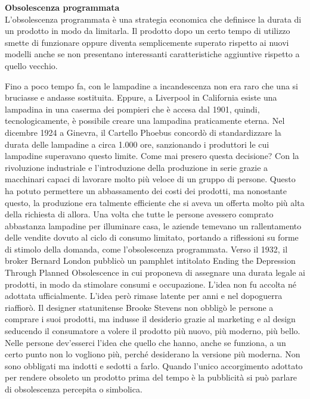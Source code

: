 \documentclass[12pt]{book} %
\begin{document}
\noindent \textbf{\large Obsolescenza programmata} \\
L'obsolescenza programmata è una strategia economica che definisce la durata di un prodotto in modo
da limitarla. Il prodotto dopo un certo tempo di utilizzo smette di funzionare oppure diventa semplicemente superato
rispetto ai nuovi modelli anche se non presentano interessanti caratteristiche aggiuntive rispetto a quello vecchio.

Fino a poco tempo fa, con le lampadine a incandescenza non era raro che
una si bruciasse e andasse sostituita. Eppure, a Liverpool in California esiste una lampadina in una caserma dei
pompieri che è accesa dal 1901, quindi, tecnologicamente, è possibile creare una lampadina praticamente eterna. Nel dicembre 1924 a Ginevra, il Cartello Phoebus concordò di standardizzare la durata delle lampadine a circa 1.000 ore, sanzionando i produttori le cui lampadine superavano questo limite. Come mai presero questa decisione? Con la rivoluzione industriale e
l'introduzione della produzione in serie grazie a macchinari capaci di lavorare molto più veloce
di un gruppo di persone. Questo ha potuto permettere un abbassamento dei costi dei prodotti, ma nonostante questo, la
produzione era talmente efficiente che si aveva un offerta molto più alta della richiesta di allora. 
Una volta che tutte le persone avessero comprato abbastanza lampadine per illuminare casa, le aziende temevano un rallentamento delle vendite dovuto al ciclo di consumo limitato, portando a riflessioni su forme di stimolo della domanda, come l’obsolescenza programmata. 
Verso il 1932, il broker Bernard London pubblicò un pamphlet intitolato Ending the Depression Through Planned Obsolescence in cui proponeva di assegnare una durata legale ai prodotti, in modo da stimolare consumi e occupazione. L’idea non fu accolta né adottata ufficialmente. L'idea però rimase latente per anni e nel dopoguerra riaffiorò. Il designer statunitense Brooke
Stevens non obbligò le persone a comprare i suoi prodotti, ma indusse il desiderio grazie al marketing e al design
seducendo il consumatore a volere il prodotto più nuovo, più moderno, più bello. Nelle persone
dev'esserci l'idea che quello che hanno, anche se funziona, a un certo punto
non lo vogliono più, perché desiderano la versione più moderna. Non sono obbligati ma indotti
e sedotti a farlo. Quando l'unico accorgimento adottato per rendere obsoleto un prodotto prima del tempo è la
pubblicità si può parlare di obsolescenza percepita o
simbolica.
\end{document}
